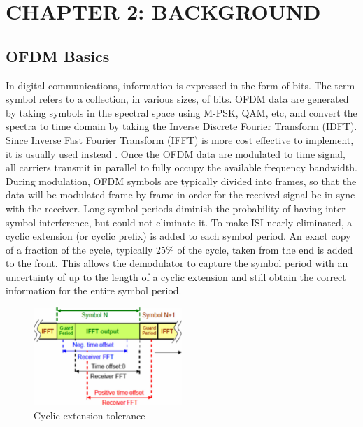 \section*{CHAPTER 2: BACKGROUND}
\setcounter{section}{2}
\setcounter{subsection}{0}
\setcounter{figure}{0}
\setcounter{table}{0}

\subsection{OFDM Basics}

In digital communications, information is expressed in the form of bits. The term symbol refers to a collection, in various sizes, of bits. OFDM data are generated by taking symbols in the spectral space using M-PSK, QAM, etc, and convert the spectra to time domain by taking the Inverse Discrete Fourier Transform (IDFT). Since Inverse Fast Fourier Transform (IFFT) is more cost effective to implement, it is usually used instead \cite{b3}. Once the OFDM data are modulated to time signal, all carriers transmit in parallel to fully occupy the available frequency bandwidth. During modulation, OFDM symbols are typically divided into frames, so that the data will be modulated frame by frame in order for the received signal be in sync with the receiver. Long symbol periods diminish the probability of having inter-symbol interference, but could not eliminate it. To make ISI nearly eliminated, a cyclic extension (or cyclic prefix) is added to each symbol period. An exact copy of a fraction of the cycle, typically 25\% of the cycle, taken from the end is added to the front. This allows the demodulator to capture the symbol period with an uncertainty of up to the length of a cyclic extension and still obtain the correct information for the entire symbol period.

\begin{figure}[ht]
    \centering
    \includegraphics[width=0.5\textwidth]{Figures/Cyclic-extension-tolerance.png}
    \caption{Cyclic-extension-tolerance}
    \label{Cyclic-extension-tolerance}
\end{figure}

